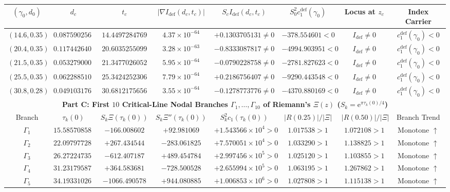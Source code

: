\documentclass[11pt,reqno]{amsart}
\theoremstyle{definition}
\theoremstyle{remark}
\numberwithin{equation}{section}
\newcommand{\ee}{\mathrm{e}}
\newcommand{\defm}{\mathrm{def}}
\begin{document}
\begin{table}[htbp]
\begin{tabular}{@{}cccccccc@{}}
\midrule
$(\gamma_0, d_0)$ & $d_c$ & $t_c$ & $|\nabla I_{\defm}(d_c,t_c)|$ & $S_c I_{\defm}(d_c,t_c)$ & $S_0^2 c_1^{\defm}(\gamma_0)$ & Locus at $z_c$ & Index Carrier \\
\midrule
$(14.6, 0.35)$ & $0.0875902564$ & $14.4497284769$ & $4.37 \times 10^{-64}$ & $+0.1303705131 \ne 0$ & $-378.554601 < 0$ & $I_{\defm} \ne 0$ & $c_1^{\defm}(\gamma_0)<0$ \\
$(20.4, 0.35)$ & $0.1174426402$ & $20.6035255099$ & $3.28 \times 10^{-63}$ & $-0.8333087817 \ne 0$ & $-4994.903951 < 0$ & $I_{\defm} \ne 0$ & $c_1^{\defm}(\gamma_0)<0$ \\
$(21.5, 0.35)$ & $0.0532790009$ & $21.3477026052$ & $5.95 \times 10^{-64}$ & $-0.0790228758 \ne 0$ & $-2781.827623 < 0$ & $I_{\defm} \ne 0$ & $c_1^{\defm}(\gamma_0)<0$ \\
$(25.5, 0.35)$ & $0.0622885100$ & $25.3424252306$ & $7.79 \times 10^{-64}$ & $+0.2186756407 \ne 0$ & $-9290.443548 < 0$ & $I_{\defm} \ne 0$ & $c_1^{\defm}(\gamma_0)<0$ \\
$(30.8, 0.28)$ & $0.0491031765$ & $30.6812175656$ & $3.55 \times 10^{-64}$ & $-0.1278773776 \ne 0$ & $-4370.880169 < 0$ & $I_{\defm} \ne 0$ & $c_1^{\defm}(\gamma_0)<0$ \\
\midrule
\multicolumn{8}{c}{\textbf{Part C: First $10$ Critical-Line Nodal Branches $\Gamma_1,\dots,\Gamma_{10}$ of Riemann's $\Xi(z)$ ($S_k = \ee^{\pi\tau_k(0)/4}$)}} \\
\midrule
Branch & $\tau_k(0)$ & $S_k\Xi(\tau_k(0))$ & $S_k\Xi''(\tau_k(0))$ & $S_k^2 c_1(\tau_k(0))$ & $|R(0.25)|/|\Xi|$ & $|R(0.50)|/|\Xi|$ & Branch Trend \\
\midrule
$\Gamma_1$ & $15.5857085898$ & $-166.008602$ & $+92.981069$ & $+1.543566 \times 10^4 > 0$ & $1.017538 > 1$ & $1.072108 > 1$ & Monotone $\uparrow$ \\
$\Gamma_2$ & $22.0979772804$ & $+267.434544$ & $-283.061825$ & $+7.570051 \times 10^4 > 0$ & $1.033290 > 1$ & $1.138825 > 1$ & Monotone $\uparrow$ \\
$\Gamma_3$ & $26.2722473569$ & $-612.407187$ & $+489.454784$ & $+2.997456 \times 10^5 > 0$ & $1.025120 > 1$ & $1.103855 > 1$ & Monotone $\uparrow$ \\
$\Gamma_4$ & $31.2317958710$ & $+364.583681$ & $-728.500528$ & $+2.655994 \times 10^5 > 0$ & $1.063195 > 1$ & $1.267862 > 1$ & Monotone $\uparrow$ \\
$\Gamma_5$ & $34.1933102690$ & $-1066.490578$ & $+944.080885$ & $+1.006853 \times 10^6 > 0$ & $1.027808 > 1$ & $1.115138 > 1$ & Monotone $\uparrow$ \\

\end{tabular}
\end{table}
\end{document}
